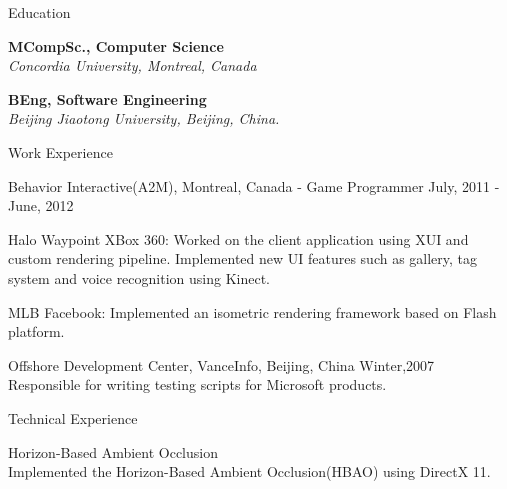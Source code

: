 \documentclass[10pt]{article}
\newenvironment{mydescription}{%
    \begin{description}
        \setlength{\itemsep}{0.25em}%
        \setlength{\parsep}{0em}%
        \setlength{\topsep}{\itemsep}%
        \setlength{\parskip}{0em}%
        \setlength{\labelwidth}{0.1em}
        \setlength{\labelsep}{0em} 
    }%
{\end{description}}
\begin{document}
\begin{cv}
\begin{cvlist}{Education}
    \item   \textbf{MCompSc., Computer Science}  \\ 
            \emph{Concordia University, Montreal, Canada}
    \item   \textbf{BEng, Software Engineering} \\
            \emph{Beijing Jiaotong University, Beijing, China.}
\end{cvlist}



\begin{cvlist}{Work Experience}
\item 
    \begin{mydescription}
		\item[Behavior Interactive(A2M), Montreal, Canada - Game Programmer]  \hfill July, 2011 - June, 2012 
			\begin{mydescription} 
			\item[Halo Waypoint XBox 360: ] {Worked on the client application using XUI and custom rendering pipeline. Implemented new UI features such as gallery, tag system and voice recognition using Kinect. }
			\item[MLB Facebook: ] {Implemented an isometric rendering framework based on Flash platform. }
			\end{mydescription}
        	\item[Offshore Development Center, VanceInfo, Beijing, China] \hfill Winter,2007 \\ 
            Responsible for writing testing scripts for Microsoft products. 
    \end{mydescription}
\end{cvlist}


\begin{cvlist}{Technical Experience}
\item
    \begin{mydescription}
        \item[Horizon-Based Ambient Occlusion] \hfill \\
			Implemented the Horizon-Based Ambient Occlusion(HBAO) using DirectX 11. 


\end{mydescription}
\end{cvlist}
\end{cv}
\end{document}
